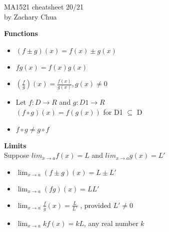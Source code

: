 \documentclass[10pt, a4paper]{article}
\author{Zach}
\date{3 November 2020}
\begin{document}
	\scriptsize %
	\setlength\parindent{0pt}
	\setlength{\columnseprule}{0.1pt}
	
	\begin{center}
		{\large MA1521 cheatsheet 20/21}\\
		by Zachary Chua
	\end{center}
	
	\begin{multicols*}{3}
		
		{\normalsize\textbf{Functions}}
			\begin{itemize}
				\setlength\itemsep{0em}
				\item $(f \pm g)(x) = f(x) \pm g(x)$
				\item $fg(x) = f(x)g(x)$
				\item $\left(\frac{f}{g}\right)(x) = \frac{f(x)}{g(x)}, g(x) \neq 0$
				\item Let $f: D \to R$ and $g: D1 \to R$\\
				$(f \circ g)(x) = f(g(x))$ for D1 $\subseteq$ D
				\item $f \circ g \neq g \circ f$
			\end{itemize}
		
		\textbf{Limits}\\
		Suppose $lim_{x \to a} f(x) = L$ and $lim_{x \to a} g(x) = L'$
		\begin{itemize}
			\setlength\itemsep{0em}
			\item $\lim_{x \to a} (f \pm g)(x) = L \pm L'$
			\item $\lim_{x \to a} (fg)(x) = LL'$
			\item $\lim_{x \to a}\frac{f}{g}(x) = \frac{L}{L'}$ , provided $L' \neq 0$
			\item $\lim_{x \to a} kf(x) = kL$, any real number $k$
		\end{itemize}
	

\end{multicols*}
\end{document}
